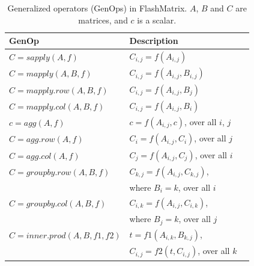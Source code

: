 \begin{table}
\begin{center}
\footnotesize
\begin{tabular}{|l|l|l|}
\hline
GenOp & Description \\
\hline
$C=sapply(A, f)$ & $C_{i,j}=f(A_{i,j})$ \\
\hline
$C=mapply(A, B, f)$ & $C_{i,j}=f(A_{i,j}, B_{i,j})$ \\
\hline
$C=mapply.row(A, B, f)$ & $C_{i,j}=f(A_{i,j}, B_j)$ \\
\hline
$C=mapply.col(A, B, f)$ & $C_{i,j}=f(A_{i,j}, B_i)$ \\
\hline
$c=agg(A, f)$ & $c=f(A_{i,j}, c)$, over all $i$, $j$ \\
\hline
$C=agg.row(A, f)$ & $C_i=f(A_{i,j}, C_i)$, over all $j$ \\
\hline
$C=agg.col(A, f)$ & $C_j=f(A_{i,j}, C_j)$, over all $i$ \\
\hline
$C=groupby.row(A, B, f)$ & $C_{k,j}=f(A_{i,j}, C_{k,j})$,\\ & where $B_i=k$, over all $i$ \\
\hline
$C=groupby.col(A, B, f)$ & $C_{i,k}=f(A_{i,j}, C_{i,k})$,\\ & where $B_j=k$, over all $j$ \\
\hline
$C=inner.prod(A, B, f1, f2)$ & $t=f1(A_{i,k}, B_{k,j})$,
\\ & $C_{i,j}=f2(t, C_{i,j})$, over all $k$ \\
\hline
\end{tabular}
\normalsize
\end{center}
\caption{Generalized operators (GenOps) in FlashMatrix.
$A$, $B$ and $C$ are matrices, and $c$ is a scalar.}
\label{tbl:genops}
\end{table}

